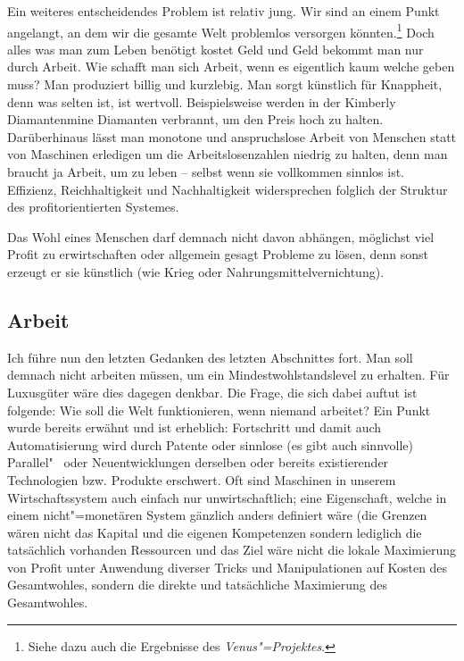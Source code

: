 Ein weiteres entscheidendes Problem ist relativ jung. Wir sind an einem Punkt angelangt, an dem wir die gesamte Welt problemlos versorgen könnten.\footnote{Siehe dazu auch die Ergebnisse des \textit{Venus"=Projektes}.} Doch alles was man zum Leben benötigt kostet Geld und Geld bekommt man nur durch Arbeit. Wie schafft man sich Arbeit, wenn es eigentlich kaum welche geben muss? Man produziert billig und kurzlebig. Man sorgt künstlich für Knappheit, denn was selten ist, ist wertvoll. Beispielsweise werden in der Kimberly Diamantenmine Diamanten verbrannt, um den Preis hoch zu halten. Darüberhinaus lässt man monotone und anspruchslose Arbeit von Menschen statt von Maschinen erledigen um die Arbeitslosenzahlen niedrig zu halten, denn man braucht ja Arbeit, um zu leben -- selbst wenn sie vollkommen sinnlos ist. Effizienz, Reichhaltigkeit und Nachhaltigkeit widersprechen folglich der Struktur des profitorientierten Systemes.

Das Wohl eines Menschen darf demnach nicht davon abhängen, möglichst viel Profit zu erwirtschaften oder allgemein gesagt Probleme zu lösen, denn sonst erzeugt er sie künstlich (wie Krieg oder Nahrungsmittelvernichtung).

\subsection{Arbeit}\label{sec:situation/work}

Ich führe nun den letzten Gedanken des letzten Abschnittes fort. Man soll demnach nicht arbeiten müssen, um ein Mindestwohlstandslevel zu erhalten. Für Luxusgüter wäre dies dagegen denkbar. Die Frage, die sich dabei auftut ist folgende: Wie soll die Welt funktionieren, wenn niemand arbeitet? Ein Punkt wurde bereits erwähnt und ist erheblich: Fortschritt und damit auch Automatisierung wird durch Patente oder sinnlose (es gibt auch sinnvolle) Parallel"~ oder Neuentwicklungen derselben oder bereits existierender Technologien bzw. Produkte erschwert. Oft sind Maschinen in unserem Wirtschaftssystem auch einfach nur unwirtschaftlich; eine Eigenschaft, welche in einem nicht"=monetären System gänzlich anders definiert wäre (die Grenzen wären nicht das Kapital und die eigenen Kompetenzen sondern lediglich die tatsächlich vorhanden Ressourcen und das Ziel wäre nicht die lokale Maximierung von Profit unter Anwendung diverser Tricks und Manipulationen auf Kosten des Gesamtwohles, sondern die direkte und tatsächliche Maximierung des Gesamtwohles.

